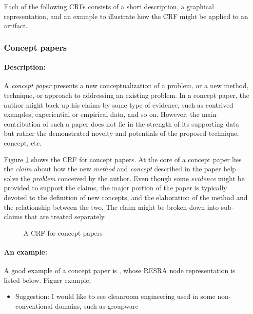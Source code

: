 \begin{itemize}
{Each of the following CRFs consists of a short description, a graphical
representation, and an example to illustrate how the CRF might be applied
to an artifact.


\subsubsection{Concept papers}

\paragraph{Description:}

A {\it concept paper\/} presents a new conceptualization of a problem, or a
new method, technique, or approach to addressing an existing problem.  In a
concept paper, the author might back up his claims by some type of
evidence, such as contrived examples, experiential or empirical data, and
so on. However, the main contribution of such a paper does not lie in the
strength of its supporting data but rather the demonstrated novelty and
potentials of the proposed technique, concept, etc.

Figure \ref{fig:concept-crf} shows the CRF for concept papers. At the core
of a concept paper lies the {\it claim\/} about how the new {\it method\/}
and {\it concept\/} described in the paper help solve the {\it problem\/}
conceived by the author. Even though some {\it evidence\/} might be
provided to support the claims, the major portion of the paper is typically
devoted to the definition of new concepts, and the elaboration of the
method and the relationship between the two. The claim might be broken down
into sub-claims that are treated separately.

\begin{figure}[htb]
  \caption{A CRF for concept papers}
  \label{fig:concept-crf}
\end{figure}


\paragraph{An example:}

A good example of a concept paper is \cite{csdl-92-07}, whose RESRA node
representation is listed below. Figurr
example,

\small
\begin{itemize}
\item {\sf Suggestion:} I would like to see cleanroom engineering used in
  some non-conventional domains, such as groupware
  

\end{itemize}}
\end{itemize}
